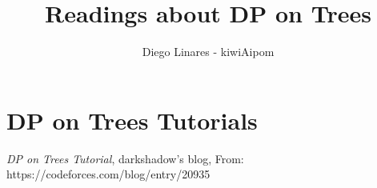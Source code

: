 \documentclass{IEEEtran}
\title{Readings about DP on Trees}
\author{Diego Linares - kiwiAipom}
\begin{document}
    \maketitle

    \section{DP on Trees Tutorials}
    
    \begin{thebibliography}{}
            \textit{DP on Trees Tutorial},
            darkshadow's blog,
            From: https://codeforces.com/blog/entry/20935
    \end{thebibliography}
\end{document}
